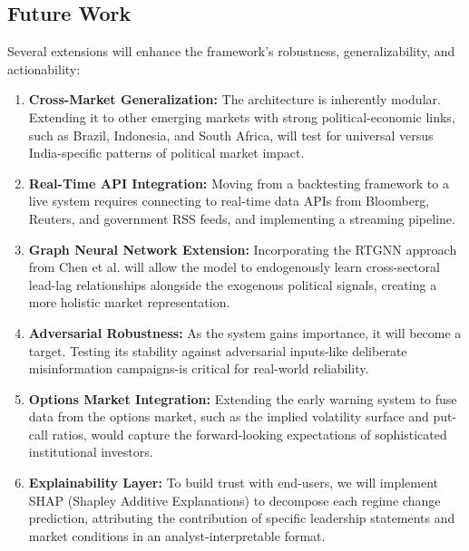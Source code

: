 \documentclass[11pt]{article}
\begin{document}
\subsection{Future Work}
Several extensions will enhance the framework's robustness, generalizability, and actionability:
\begin{enumerate}[leftmargin=*, itemsep=0pt, topsep=4pt]
    \item \textbf{Cross-Market Generalization:} The architecture is inherently modular. Extending it to other emerging markets with strong political-economic links, such as Brazil, Indonesia, and South Africa, will test for universal versus India-specific patterns of political market impact.
    \item \textbf{Real-Time API Integration:} Moving from a backtesting framework to a live system requires connecting to real-time data APIs from Bloomberg, Reuters, and government RSS feeds, and implementing a streaming pipeline.
    \item \textbf{Graph Neural Network Extension:} Incorporating the RTGNN approach from Chen et al. \cite{chen2024} will allow the model to endogenously learn cross-sectoral lead-lag relationships alongside the exogenous political signals, creating a more holistic market representation.
    \item \textbf{Adversarial Robustness:} As the system gains importance, it will become a target. Testing its stability against adversarial inputs-like deliberate misinformation campaigns-is critical for real-world reliability.
    \item \textbf{Options Market Integration:} Extending the early warning system to fuse data from the options market, such as the implied volatility surface and put-call ratios, would capture the forward-looking expectations of sophisticated institutional investors.
    \item \textbf{Explainability Layer:} To build trust with end-users, we will implement SHAP (Shapley Additive Explanations) to decompose each regime change prediction, attributing the contribution of specific leadership statements and market conditions in an analyst-interpretable format.
\end{enumerate}
\end{document}
